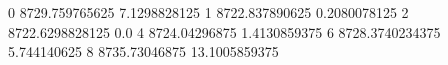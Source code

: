 0 8729.759765625 7.1298828125
1 8722.837890625 0.2080078125
2 8722.6298828125 0.0
4 8724.04296875 1.4130859375
6 8728.3740234375 5.744140625
8 8735.73046875 13.1005859375
